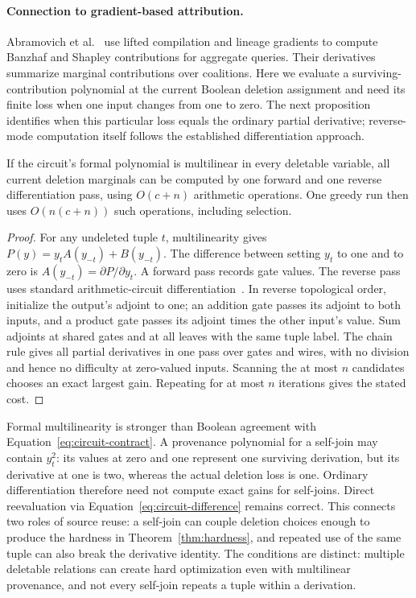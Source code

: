 \paragraph{Connection to gradient-based attribution.}
Abramovich et al.~\cite{abramovich2025attribution} use lifted compilation
and lineage gradients to compute Banzhaf and Shapley contributions for
aggregate queries. Their derivatives summarize marginal contributions over
coalitions. Here we evaluate a surviving-contribution polynomial at the
current Boolean deletion assignment and need its finite loss when one
input changes from one to zero. The next proposition identifies when this
particular loss equals the ordinary partial derivative; reverse-mode
computation itself follows the established differentiation approach.

\begin{proposition}
\label{prop:gradient}
If the circuit's formal polynomial is multilinear in every deletable
variable, all current deletion marginals can be computed by one forward
and one reverse differentiation pass, using $O(c+n)$ arithmetic operations.
One greedy run then uses $O(n(c+n))$ such operations, including selection.
\end{proposition}
\begin{proof}
For any undeleted tuple $t$, multilinearity gives
$P(y)=y_t A(y_{-t})+B(y_{-t})$. The difference between setting $y_t$ to
one and to zero is $A(y_{-t})=\partial P/\partial y_t$. A forward pass
records gate values. The reverse pass uses standard arithmetic-circuit
differentiation~\cite{baur1983derivatives}. In reverse topological order, initialize the output's
adjoint to one; an addition gate passes its adjoint to both inputs, and a
product gate passes its adjoint times the other input's value. Sum
adjoints at shared gates and at all leaves with the same tuple label.
The chain rule gives all partial derivatives in one pass over gates and
wires, with no division and hence no difficulty at zero-valued inputs.
Scanning the at most $n$ candidates chooses an exact largest gain.
Repeating for at most $n$ iterations gives the stated cost.
\end{proof}

Formal multilinearity is stronger than Boolean agreement with
Equation~\eqref{eq:circuit-contract}. A provenance polynomial for a
self-join may contain $y_t^2$: its values at zero and one represent one
surviving derivation, but its derivative at one is two, whereas the
actual deletion loss is one. Ordinary differentiation therefore need
not compute exact gains for self-joins. Direct reevaluation via
Equation~\eqref{eq:circuit-difference} remains correct. This connects two
roles of source reuse: a self-join can couple deletion choices enough to
produce the hardness in Theorem~\ref{thm:hardness}, and repeated use of the
same tuple can also break the derivative identity. The conditions are
distinct: multiple deletable relations can create hard optimization even
with multilinear provenance, and not every self-join repeats a tuple
within a derivation.

